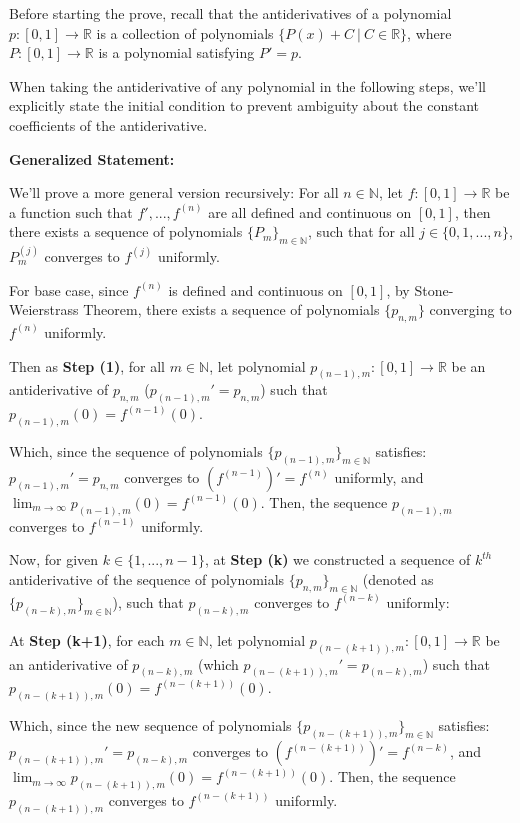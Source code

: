 \documentclass{article}
\begin{document}
Before starting the prove, recall that the antiderivatives of a polynomial $p:[0,1]\rightarrow\mathbb{R}$ is a collection of polynomials $\{P(x)+C\ |\ C\in\mathbb{R}\}$, 
where $P:[0,1]\rightarrow\mathbb{R}$ is a polynomial satisfying $P'=p$.

When taking the antiderivative of any polynomial in the following steps, we'll explicitly state the initial condition to prevent ambiguity about the constant coefficients of the antiderivative.

\hfill

\textbf{Generalized Statement:}

We'll prove a more general version recursively: For all $n\in\mathbb{N}$, let $f:[0,1]\rightarrow\mathbb{R}$ be a function such that $f',...,f^{(n)}$ are all defined and continuous on $[0,1]$,
then there exists a sequence of polynomials $\{P_m\}_{m\in\mathbb{N}}$, such that for all $j\in\{0,1,...,n\}$, $P_m^{(j)}$ converges to $f^{(j)}$ uniformly.

\hfill

For base case, since $f^{(n)}$ is defined and continuous on $[0,1]$, by Stone-Weierstrass Theorem, there exists a sequence of polynomials $\{p_{n,m}\}$ converging to $f^{(n)}$ uniformly.

Then as \textbf{Step (1)}, for all $m\in\mathbb{N}$, let polynomial $p_{(n-1),m}:[0,1]\rightarrow\mathbb{R}$ be an antiderivative of $p_{n,m}$ ($p_{(n-1),m}'=p_{n,m}$) such that $p_{(n-1),m}(0) = f^{(n-1)}(0)$.

Which, since the sequence of polynomials $\{p_{(n-1),m}\}_{m\in\mathbb{N}}$ satisfies: $p_{(n-1),m}' = p_{n,m}$ converges to $(f^{(n-1)})' = f^{(n)}$ uniformly, and $\lim_{m\rightarrow\infty}p_{(n-1),m}(0) = f^{(n-1)}(0)$.
Then, the sequence $p_{(n-1),m}$ converges to $f^{(n-1)}$ uniformly.

\hfill

Now, for given $k\in\{1,...,n-1\}$, at \textbf{Step (k)} we constructed a sequence of $k^{th}$ antiderivative of the sequence of polynomials $\{p_{n,m}\}_{m\in\mathbb{N}}$ (denoted as $\{p_{(n-k),m}\}_{m\in\mathbb{N}}$), such that $p_{(n-k),m}$ converges to $f^{(n-k)}$ uniformly:

At \textbf{Step (k+1)}, for each $m\in\mathbb{N}$, let polynomial $p_{(n-(k+1)),m}:[0,1]\rightarrow\mathbb{R}$ be an antiderivative of $p_{(n-k),m}$ (which $p_{(n-(k+1)),m}' = p_{(n-k),m}$) such that $p_{(n-(k+1)),m}(0) = f^{(n-(k+1))}(0)$.

Which, since the new sequence of polynomials $\{p_{(n-(k+1)),m}\}_{m\in\mathbb{N}}$ satisfies: $p_{(n-(k+1)),m}'=p_{(n-k),m}$ converges to $(f^{(n-(k+1))})'=f^{(n-k)}$,
and $\lim_{m\rightarrow\infty}p_{(n-(k+1)),m}(0)=f^{(n-(k+1))}(0)$. Then, the sequence $p_{(n-(k+1)),m}$ converges to $f^{(n-(k+1))}$ uniformly.
\end{document}
